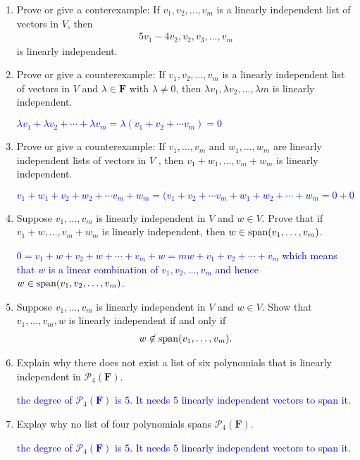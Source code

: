 \documentclass[10pt,a4paper]{report}
\newcommand{\BLUE}[1]{\textcolor{blue}{#1}}
\newcommand{\F}{\textbf{F}}
\begin{document}
\begin{enumerate}
\item Prove or give a conterexample: If $v_1,v_2, \dots,v_m$ is a linearly independent list of vectors in $V$, then 
\begin{align*}
	5v_1-4v_2, v_2,v_3, \dots, v_m
\end{align*}is linearly independent.

\item Prove or give a counterexample: If $v_1,v_2,\dots,v_m$ is a linearly independent list of vectors in $V$ and $\lambda \in \F$ with $\lambda \ne 0$, then $\lambda v_1, \lambda v_2, \dots, \lambda m$ is linearly independent.

	\BLUE{$\lambda v_1+\lambda v_2+\cdots+\lambda v_m=\lambda(v_1+v_2+\cdots v_m)=0$}

\item Prove or give a counterexample: If $v_1, \dots, v_m$ and $w_1, \dots, w_m$ are linearly independent lists of vectors in $V$ , then $v_1+w_1, \dots, v_m+w_m$ is linearly independent.

	\BLUE{$v_1+w_1+v_2+w_2+\cdots v_m+w_m= (v_1+v_2+\cdots v_m+w_1+w_2+\cdots+w_m = 0+0$}

\item Suppose $v_1, \dots, v_m$ is linearly independent in $V$ and $w \in V$.  Prove that if $v_1+w, \dots, v_m+w_m$ is linearly independent, then $w \in \operatorname{span}(v_1, \dots, v_m)$.

	\BLUE{$0=v_1+w+v_2+w+\cdots +v_m+w = mw+v_1+v_2+\cdots +v_m$ which means that $w$ is a linear combination of $v_1,v_2, \dots, v_m$ and hence $w \in \operatorname{span}(v_1,v_2,\dots, v_m)$.
	}

\item Suppose $v_1, \dots, v_m$ is linearly independent in $V$ and $w \in V$.  Show that $v_1, \dots, v_m, w$ is linearly independent if and only if 
\begin{align*}
	w \not \in \operatorname{span}(v_1, \dots, v_m).
\end{align*}

\item Explain why there does not exist a list of six polynomials that is linearly independent in $\mathcal{P}_4(\F)$.

\BLUE{the degree of $\mathcal{P}_4(\F)$ is 5.  It needs 5 linearly independent vectors to span it.}

\item Explay why no list of four polynomials spans $\mathcal{P}_4(\F)$.

\BLUE{the degree of $\mathcal{P}_4(\F)$ is 5.  It needs 5 linearly independent vectors to span it.}


\end{enumerate}
\end{document}
